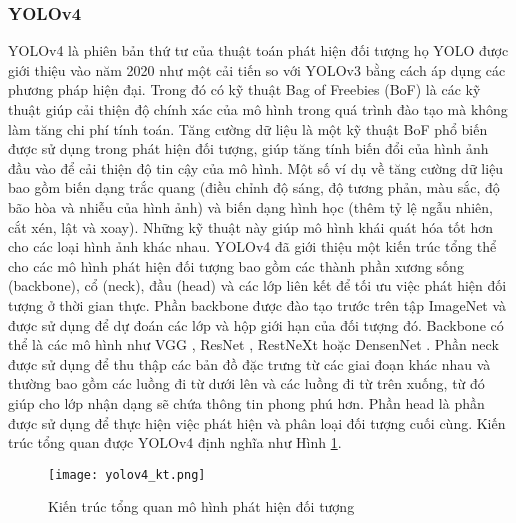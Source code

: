 \documentclass[../the.tex]{subfiles}
\begin{document}
\subsubsection{YOLOv4}
{\fontsize{13}{12} \selectfont

	YOLOv4 là phiên bản thứ tư của thuật toán phát hiện đối tượng họ YOLO được giới thiệu vào năm 2020 \cite{bochkovskiy2020yolov4} như một cải tiến so với YOLOv3 bằng cách áp dụng các phương pháp hiện đại.
	Trong đó có kỹ thuật Bag of Freebies (BoF) là các kỹ thuật giúp cải thiện độ chính xác của mô hình trong quá trình đào tạo mà không làm tăng chi phí tính toán.
	Tăng cường dữ liệu là một kỹ thuật BoF phổ biến được sử dụng trong phát hiện đối tượng, giúp tăng tính biến đổi của hình ảnh đầu vào để cải thiện độ tin cậy của mô hình. Một số ví dụ về tăng cường dữ liệu bao gồm biến dạng trắc quang (điều chỉnh độ sáng, độ tương phản, màu sắc, độ bão hòa và nhiễu của hình ảnh) và biến dạng hình học (thêm tỷ lệ ngẫu nhiên, cắt xén, lật và xoay). Những kỹ thuật này giúp mô hình khái quát hóa tốt hơn cho các loại hình ảnh khác nhau.
	YOLOv4 đã giới thiệu một kiến trúc tổng thể cho các mô hình phát hiện đối tượng bao gồm các thành phần xương sống (backbone), cổ (neck), đầu (head) và các lớp liên kết để tối ưu việc phát hiện đối tượng ở thời gian thực. Phần backbone được đào tạo trước trên tập ImageNet và được sử dụng để dự đoán các lớp và hộp giới hạn của đối tượng đó.
	Backbone có thể là các mô hình như VGG \cite{simonyan2015deep}, ResNet \cite{he2015deep}, RestNeXt \cite{xie2017aggregated} hoặc DensenNet \cite{huang2018densely}.
	Phần neck được sử dụng để thu thập các bản đồ đặc trưng từ các giai đoạn khác nhau và thường bao gồm các luồng đi từ dưới lên và các luồng đi từ trên xuống, từ đó giúp cho lớp nhận dạng sẽ chứa thông tin phong phú hơn. Phần head là phần được sử dụng để thực hiện việc phát hiện và phân loại đối tượng cuối cùng.
	Kiến trúc tổng quan được YOLOv4 định nghĩa như Hình \ref{fig:yolov4_1}.

}
\begin{figure}[H]
	\centering
	\texttt{[image: yolov4\_kt.png]}
	\caption{Kiến trúc tổng quan mô hình phát hiện đối tượng \cite{bochkovskiy2020yolov4}}
	\label{fig:yolov4_1}
\end{figure}
\end{document}
